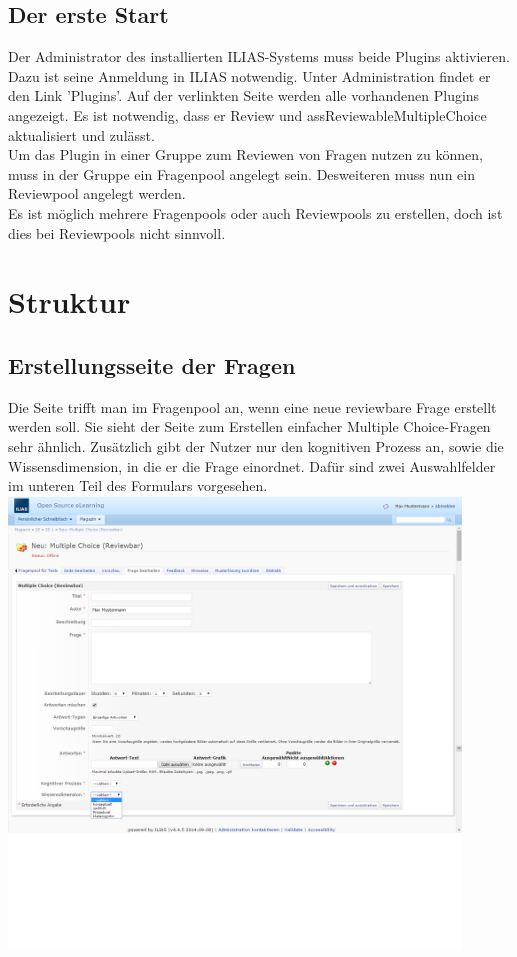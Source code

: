 \documentclass[12pt,a4paper]{scrreprt}
\begin{document}
\section{Der erste Start}
Der Administrator des installierten ILIAS-Systems muss beide Plugins aktivieren. Dazu ist seine Anmeldung in ILIAS notwendig. Unter Administration findet er den Link 'Plugins'. Auf der verlinkten Seite werden alle vorhandenen Plugins angezeigt. Es ist notwendig, dass er Review und assReviewableMultipleChoice aktualisiert und zulässt. \\
	Um das Plugin in einer Gruppe zum Reviewen von Fragen nutzen zu können, muss in der Gruppe ein Fragenpool angelegt sein. Desweiteren muss nun ein Reviewpool angelegt werden.\\
	Es ist möglich mehrere Fragenpools oder auch Reviewpools zu erstellen, doch ist dies bei Reviewpools nicht sinnvoll. 

\chapter{Struktur}

\section{Erstellungsseite der Fragen}
Die Seite trifft man im Fragenpool an, wenn eine neue reviewbare Frage erstellt werden soll. Sie sieht der Seite zum Erstellen einfacher Multiple Choice-Fragen sehr ähnlich. Zusätzlich gibt der Nutzer nur den kognitiven Prozess an, sowie die Wissensdimension, in die er die Frage einordnet. Dafür sind zwei Auswahlfelder im unteren Teil des Formulars vorgesehen.\\
\includegraphics[width=0.9\textwidth]{frage_erstellen.png}
\\
\end{document}
